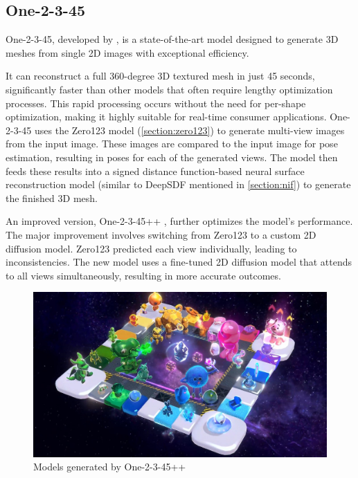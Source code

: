 \subsection{One-2-3-45} \label{section:one-2-3-45}
One-2-3-45, developed by \textcite{liu_one-2-3-45_2023}, is a state-of-the-art model designed to generate 3D meshes from single 2D images with exceptional efficiency.

It can reconstruct a full 360-degree 3D textured mesh in just 45 seconds, significantly faster than other models that often require lengthy optimization processes. This rapid processing occurs without the need for per-shape optimization, making it highly suitable for real-time consumer applications.
One-2-3-45 uses the Zero123 model (\ref{section:zero123}) to generate multi-view images from the input image. These images are compared to the input image for pose estimation, resulting in poses for each of the generated views.
The model then feeds these results into a signed distance function-based neural surface reconstruction model (similar to DeepSDF mentioned in \ref{section:nif}) to generate the finished 3D mesh.

An improved version, One-2-3-45++ \autocite{liu_one-2-3-45_2024}, further optimizes the model's performance.
The major improvement involves switching from Zero123 to a custom 2D diffusion model. Zero123 predicted each view individually, leading to inconsistencies. The new model uses a fine-tuned 2D diffusion model that attends to all views simultaneously, resulting in more accurate outcomes.

\begin{figure}
    \centering
    \includegraphics[width=1\linewidth]{images/one-2-3-45++_demo.jpg}
    \caption{Models generated by One-2-3-45++ \autocite{liu_one-2-3-45_2024}}
    \label{fig:one-2-3-4-5-plus-plus-demo}
\end{figure}

